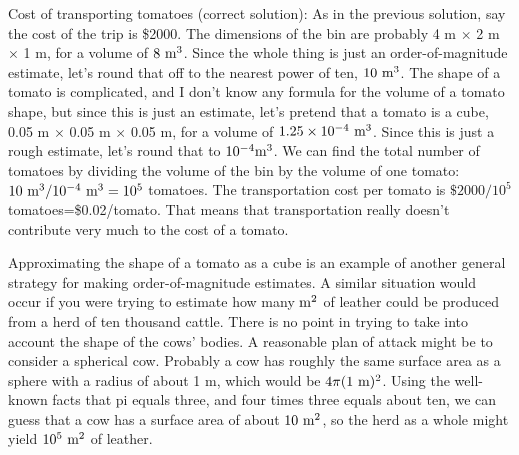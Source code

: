 


\vspace{1.5mm}





\begin{exmp}
Cost of transporting tomatoes (correct solution): 
As in the previous solution, say the cost
of the trip is \$2000. The dimensions of the bin are
probably 4 m $\times$ 2 m $\times$ 1 m, for a volume of $8\ \textup{m}^3$.
Since the whole thing is just an order-of-magnitude
estimate, let's round that off to the nearest power of ten,
$10\ \textup{m}^3$. The shape of a tomato is complicated, and I don't
know any formula for the volume of a tomato shape, but since
this is just an estimate, let's pretend that a tomato is a
cube, 0.05 m $\times$ 0.05 m $\times$ 0.05 m, for a volume of $1.25\times10^{-4}\ \munit^3$.
Since this is just a rough estimate, let's round that to
$10^{-4} \textup{m}^3$. We can find the total number of tomatoes by
dividing the volume of the bin by the volume of one tomato:
$10\ \munit^3/10^{-4}\ \munit^3=10^5$ tomatoes. The transportation cost
per tomato is $\$2000/10^5$ tomatoes=\$0.02/tomato. That
means that transportation really doesn't contribute very
much to the cost of a tomato.
\end{exmp}
\divider
\vspace{2mm}

Approximating the shape of a tomato as a cube is an example
of another general strategy for making order-of-magnitude
estimates. A similar situation would occur if you were
trying to estimate how many $\textup{m}^2$ of leather could be
produced from a herd of ten thousand cattle. There is no
point in trying to take into account the shape of the cows'
bodies. A reasonable plan of attack might be to consider a
spherical cow. Probably a cow has roughly the same surface
area as a sphere with a radius of about 1 m, which would
be $4\pi (1\ \textup{m})^2$. Using the well-known facts that pi
equals three, and four times three equals about ten, we can
guess that a cow has a surface area of about $10\ \textup{m}^2$, so
the herd as a whole might yield $10^5\ \textup{m}^2$ of leather.

